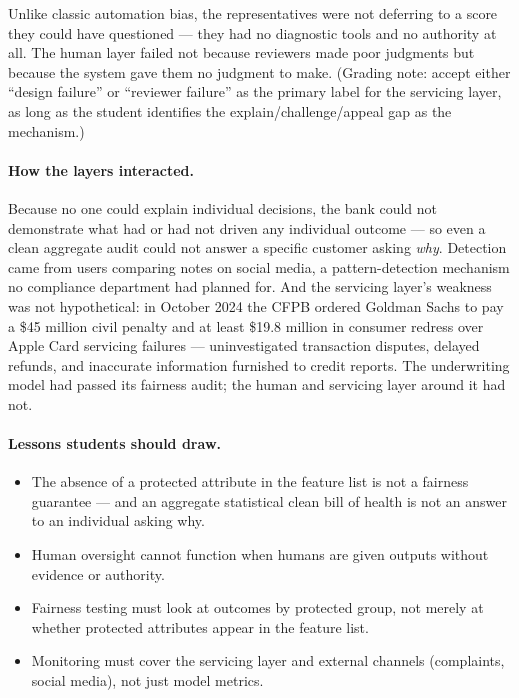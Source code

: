 Unlike classic automation bias, the representatives were not deferring to a score they could have questioned --- they had no diagnostic tools and no authority at all. The human layer failed not because reviewers made poor judgments but because the system gave them no judgment to make. (Grading note: accept either ``design failure'' or ``reviewer failure'' as the primary label for the servicing layer, as long as the student identifies the explain/challenge/appeal gap as the mechanism.)

\paragraph{How the layers interacted.}

Because no one could explain individual decisions, the bank could not demonstrate what had or had not driven any individual outcome --- so even a clean aggregate audit could not answer a specific customer asking \emph{why}. Detection came from users comparing notes on social media, a pattern-detection mechanism no compliance department had planned for. And the servicing layer's weakness was not hypothetical: in October 2024 the CFPB ordered Goldman Sachs to pay a \$45 million civil penalty and at least \$19.8 million in consumer redress over Apple Card servicing failures --- uninvestigated transaction disputes, delayed refunds, and inaccurate information furnished to credit reports. The underwriting model had passed its fairness audit; the human and servicing layer around it had not.

\paragraph{Lessons students should draw.}

\begin{itemize}
    \item The absence of a protected attribute in the feature list is not a fairness guarantee --- and an aggregate statistical clean bill of health is not an answer to an individual asking why.
    \item Human oversight cannot function when humans are given outputs without evidence or authority.
    \item Fairness testing must look at outcomes by protected group, not merely at whether protected attributes appear in the feature list.
    \item Monitoring must cover the servicing layer and external channels (complaints, social media), not just model metrics.
\end{itemize}

